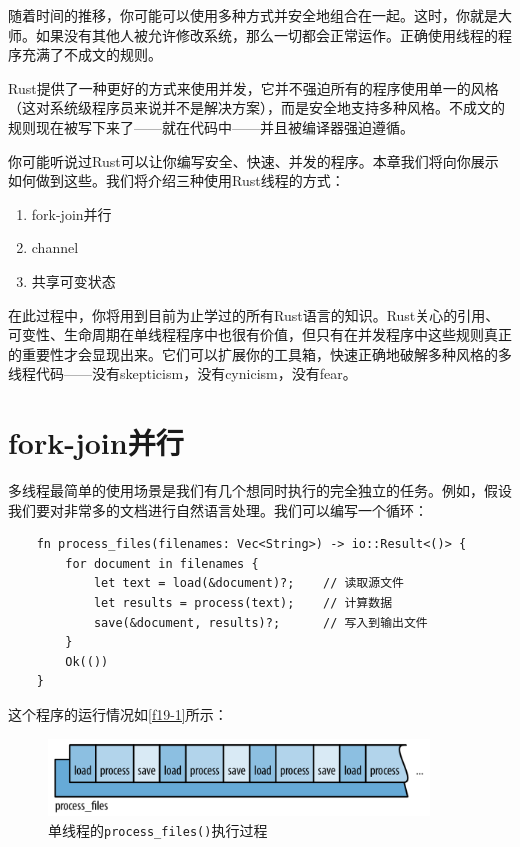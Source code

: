 随着时间的推移，你可能可以使用多种方式并安全地组合在一起。这时，你就是大师。如果没有其他人被允许修改系统，那么一切都会正常运作。正确使用线程的程序充满了不成文的规则。

Rust提供了一种更好的方式来使用并发，它并不强迫所有的程序使用单一的风格（这对系统级程序员来说并不是解决方案），而是安全地支持多种风格。不成文的规则现在被写下来了——就在代码中——并且被编译器强迫遵循。

你可能听说过Rust可以让你编写安全、快速、并发的程序。本章我们将向你展示如何做到这些。我们将介绍三种使用Rust线程的方式：
\begin{enumerate}
    \item fork-join并行
    \item channel
    \item 共享可变状态
\end{enumerate}

在此过程中，你将用到目前为止学过的所有Rust语言的知识。Rust关心的引用、可变性、生命周期在单线程程序中也很有价值，但只有在并发程序中这些规则真正的重要性才会显现出来。它们可以扩展你的工具箱，快速正确地破解多种风格的多线程代码——没有skepticism，没有cynicism，没有fear。

\section{fork-join并行}
多线程最简单的使用场景是我们有几个想同时执行的完全独立的任务。例如，假设我们要对非常多的文档进行自然语言处理。我们可以编写一个循环：
\begin{verbatim}
    fn process_files(filenames: Vec<String>) -> io::Result<()> {
        for document in filenames {
            let text = load(&document)?;    // 读取源文件
            let results = process(text);    // 计算数据
            save(&document, results)?;      // 写入到输出文件
        }
        Ok(())
    }
\end{verbatim}

这个程序的运行情况如\autoref{f19-1}所示：

\begin{figure}[htbp]
    \centering
    \includegraphics[width=0.9\textwidth]{../img/f19-1.png}
    \caption{单线程的\texttt{process\_files()}执行过程}
    \label{f19-1}
\end{figure}

